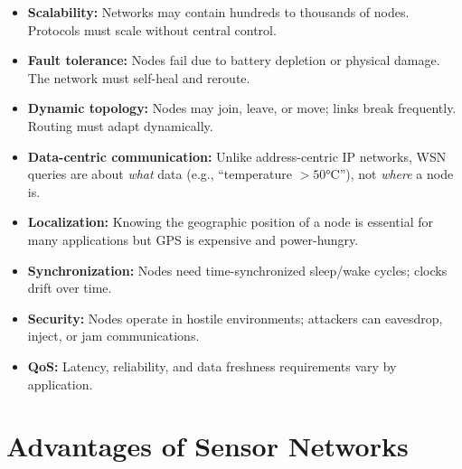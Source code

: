 \documentclass[12pt,a4paper]{article}
\begin{document}
\begin{itemize}[leftmargin=*, itemsep=3pt]
  \item \textbf{Scalability:} Networks may contain hundreds to thousands of nodes. Protocols must scale without central control.
  \item \textbf{Fault tolerance:} Nodes fail due to battery depletion or physical damage. The network must self-heal and reroute.
  \item \textbf{Dynamic topology:} Nodes may join, leave, or move; links break frequently. Routing must adapt dynamically.
  \item \textbf{Data-centric communication:} Unlike address-centric IP networks, WSN queries are about \emph{what} data (e.g., ``temperature $> 50$°C''), not \emph{where} a node is.
  \item \textbf{Localization:} Knowing the geographic position of a node is essential for many applications but GPS is expensive and power-hungry.
  \item \textbf{Synchronization:} Nodes need time-synchronized sleep/wake cycles; clocks drift over time.
  \item \textbf{Security:} Nodes operate in hostile environments; attackers can eavesdrop, inject, or jam communications.
  \item \textbf{QoS:} Latency, reliability, and data freshness requirements vary by application.
\end{itemize}

\section{Advantages of Sensor Networks}
\end{document}

